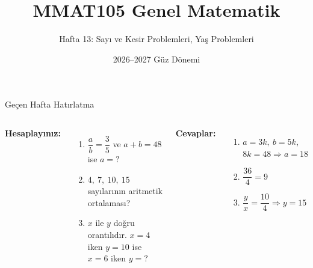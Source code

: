\documentclass[aspectratio=169,11pt,handout]{beamer}
\title[MMAT105 -- Hafta 13]{MMAT105 Genel Matematik}
\subtitle{Hafta 13: Sayı ve Kesir Problemleri, Yaş Problemleri}
\author{}
\date{2026--2027 Güz Dönemi}
\begin{document}
\begin{frame}
\titlepage
\end{frame}


\begin{frame}{Geçen Hafta Hatırlatma}
\begin{columns}[t]
\textbf{Hesaplayınız:}
\begin{enumerate}
\item \(\dfrac{a}{b}=\dfrac{3}{5}\) ve \(a+b=48\) ise \(a=?\)
\item \(4,\ 7,\ 10,\ 15\) sayılarının aritmetik ortalaması?
\item \(x\) ile \(y\) doğru orantılıdır. \(x=4\) iken \(y=10\) ise \(x=6\) iken \(y=?\)
\end{enumerate}
\pause
\textbf{Cevaplar:}
\begin{enumerate}
\item \(a=3k,\ b=5k\), \(8k=48\Rightarrow a=18\)
\item \(\dfrac{36}{4}=9\)
\item \(\dfrac{y}{x}=\dfrac{10}{4}\Rightarrow y=15\)
\end{enumerate}
\end{columns}
\end{frame}
\end{document}
